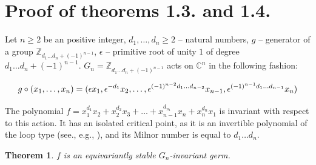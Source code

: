 \documentclass{amsart}
\newtheorem{theorem}[subsection]{Theorem}
\begin{document}
\section{Proof of theorems 1.3. and 1.4.}



Let $n\geq2$ be an positive integer, $d_1, \ldots, d_n \geq 2$ -- natural numbers, $g$ -- generator of a group  $\mathbb{Z}_{d_1\ldots d_n +  (-1)^{n-1}}$,  $\epsilon$ -- primitive root of unity $1$ of degree $d_1\ldots d_n +  (-1)^{n-1}$.
 $G_n = \mathbb{Z}_{d_1\ldots d_n + (-1)^{n-1}}$ acts on $\mathbb{C}^n$ in the following fashion: 
 
 \begin{equation}{\nonumber}
g \circ (x_1, \ldots, x_n) = (\epsilon x_1, \epsilon^{-d_1} x_2, \ldots, \epsilon^{(-1)^{n-2} d_1 \ldots d_{n-2}} x_{n-1}, \epsilon^{(-1)^{n-1} d_1 \ldots d_{n-1}} x_n)
 \end{equation}

 The polynomial $f = x_1^{d_1} x_2 + x_2^{d_2} x_3 + \ldots + x_{n-1}^{d_{n_1}} x_n + x_n^{d_n} x_1$ is invariant with respect to this action. It has an isolated critical point, as it is an invertible polynomial of the loop type (see., e.g., \cite{10,11}), and its Milnor number is equal to $d_1\ldots d_n$.
 
\begin{theorem}
$f$ is an equivariantly stable $G_n$-invariant germ.
\end{theorem}
\end{document}
